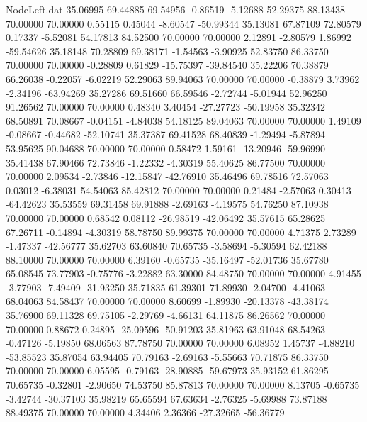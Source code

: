 \begin{filecontents}{NodeLeft.dat}
  35.06995   69.44885   69.54956    -0.86519   -5.12688   52.29375   88.13438   70.00000   70.00000    0.55115    0.45044   -8.60547  -50.99344
  35.13081   67.87109   72.80579     0.17337   -5.52081   54.17813   84.52500   70.00000   70.00000    2.12891   -2.80579    1.86992  -59.54626
  35.18148   70.28809   69.38171    -1.54563   -3.90925   52.83750   86.33750   70.00000   70.00000   -0.28809    0.61829  -15.75397  -39.84540
  35.22206   70.38879   66.26038    -0.22057   -6.02219   52.29063   89.94063   70.00000   70.00000   -0.38879    3.73962   -2.34196  -63.94269
  35.27286   69.51660   66.59546    -2.72744   -5.01944   52.96250   91.26562   70.00000   70.00000    0.48340    3.40454  -27.27723  -50.19958
  35.32342   68.50891   70.08667    -0.04151   -4.84038   54.18125   89.04063   70.00000   70.00000    1.49109   -0.08667   -0.44682  -52.10741
  35.37387   69.41528   68.40839    -1.29494   -5.87894   53.95625   90.04688   70.00000   70.00000    0.58472    1.59161  -13.20946  -59.96990
  35.41438   67.90466   72.73846    -1.22332   -4.30319   55.40625   86.77500   70.00000   70.00000    2.09534   -2.73846  -12.15847  -42.76910
  35.46496   69.78516   72.57063     0.03012   -6.38031   54.54063   85.42812   70.00000   70.00000    0.21484   -2.57063    0.30413  -64.42623
  35.53559   69.31458   69.91888    -2.69163   -4.19575   54.76250   87.10938   70.00000   70.00000    0.68542    0.08112  -26.98519  -42.06492
  35.57615   65.28625   67.26711    -0.14894   -4.30319   58.78750   89.99375   70.00000   70.00000    4.71375    2.73289   -1.47337  -42.56777
  35.62703   63.60840   70.65735    -3.58694   -5.30594   62.42188   88.10000   70.00000   70.00000    6.39160   -0.65735  -35.16497  -52.01736
  35.67780   65.08545   73.77903    -0.75776   -3.22882   63.30000   84.48750   70.00000   70.00000    4.91455   -3.77903   -7.49409  -31.93250
  35.71835   61.39301   71.89930    -2.04700   -4.41063   68.04063   84.58437   70.00000   70.00000    8.60699   -1.89930  -20.13378  -43.38174
  35.76900   69.11328   69.75105    -2.29769   -4.66131   64.11875   86.26562   70.00000   70.00000    0.88672    0.24895  -25.09596  -50.91203
  35.81963   63.91048   68.54263    -0.47126   -5.19850   68.06563   87.78750   70.00000   70.00000    6.08952    1.45737   -4.88210  -53.85523
  35.87054   63.94405   70.79163    -2.69163   -5.55663   70.71875   86.33750   70.00000   70.00000    6.05595   -0.79163  -28.90885  -59.67973
  35.93152   61.86295   70.65735    -0.32801   -2.90650   74.53750   85.87813   70.00000   70.00000    8.13705   -0.65735   -3.42744  -30.37103
  35.98219   65.65594   67.63634    -2.76325   -5.69988   73.87188   88.49375   70.00000   70.00000    4.34406    2.36366  -27.32665  -56.36779

\end{filecontents}

